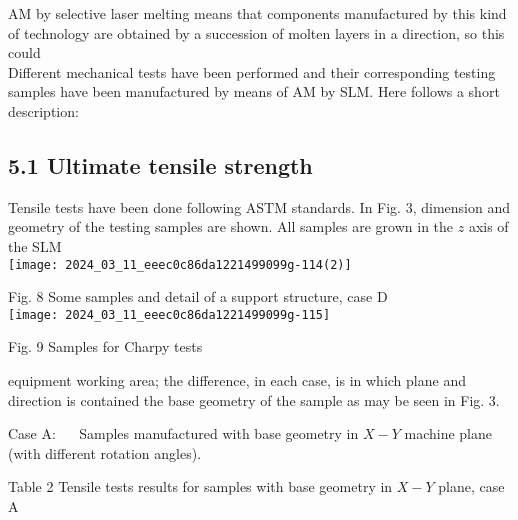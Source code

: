 \documentclass[10pt]{article}
\begin{document}
AM by selective laser melting means that components manufactured by this kind of technology are obtained by a succession of molten layers in a direction, so this could\\
Different mechanical tests have been performed and their corresponding testing samples have been manufactured by means of AM by SLM. Here follows a short description:

\subsection*{5.1 Ultimate tensile strength}
Tensile tests have been done following ASTM standards. In Fig. 3, dimension and geometry of the testing samples are shown. All samples are grown in the $z$ axis of the SLM\\
\texttt{[image: 2024\_03\_11\_eeec0c86da1221499099g-114(2)]}

Fig. 8 Some samples and detail of a support structure, case D\\
\texttt{[image: 2024\_03\_11\_eeec0c86da1221499099g-115]}

Fig. 9 Samples for Charpy tests

equipment working area; the difference, in each case, is in which plane and direction is contained the base geometry of the sample as may be seen in Fig. 3.

Case A: $\quad$ Samples manufactured with base geometry in $X-Y$ machine plane (with different rotation angles).

Table 2 Tensile tests results for samples with base geometry in $X-Y$ plane, case A
\end{document}
